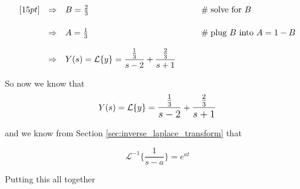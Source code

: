 \documentclass{article}
\theoremstyle{definition}
\begin{document}
\begin{equation*}
\begin{array}{lllll}
[15pt]
&\Rightarrow&  B =\frac{2}{3}                                                                                                                                 &\qquad \mathrel{\#} \text{solve for $B$}                                       \\
[15pt]
&\Rightarrow&  A =\frac{1}{3}                                                                                                                                 &\qquad \mathrel{\#} \text{plug $B$ into $A = 1 - B$}                     \\
[12pt] 
&\Rightarrow& Y(s) = \mathcal{L}\{y\} = \mathlarger{\frac{\frac{1}{3}}{s-2}} + \mathlarger{\frac{\frac{2}{3}}{s+1}}  
\end{array}
\end{equation*}

\bigskip
\noindent
So now we know that 
\begin{equation*}
Y(s) = \mathcal{L}\{y\} = \mathlarger{\frac{\frac{1}{3}}{s-2}} + \mathlarger{\frac{\frac{2}{3}}{s+1}} 
\end{equation*}

\bigskip
\noindent
and we know from Section \ref{sec:inverse_laplace_transform} that

\begin{equation*}
\mathcal{L}^{-1} \bigg \{ \frac{1}{s-a} \bigg \} =   e^{at}
\end{equation*}

\bigskip
\noindent
Putting this all together
\end{document}
